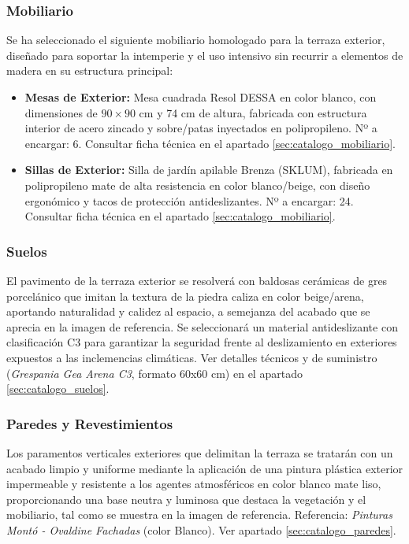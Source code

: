 \documentclass[12pt,a4paper]{article}
\begin{document}
\subsubsection{Mobiliario}
Se ha seleccionado el siguiente mobiliario homologado para la terraza exterior, diseñado para soportar la intemperie y el uso intensivo sin recurrir a elementos de madera en su estructura principal:
\begin{itemize}
    \item \textbf{Mesas de Exterior:} Mesa cuadrada Resol DESSA en color blanco, con dimensiones de $90 \times 90$ cm y 74 cm de altura, fabricada con estructura interior de acero zincado y sobre/patas inyectados en polipropileno. Nº a encargar: 6. Consultar ficha técnica en el apartado \ref{sec:catalogo_mobiliario}.
    \item \textbf{Sillas de Exterior:} Silla de jardín apilable Brenza (SKLUM), fabricada en polipropileno mate de alta resistencia en color blanco/beige, con diseño ergonómico y tacos de protección antideslizantes. Nº a encargar: 24. Consultar ficha técnica en el apartado \ref{sec:catalogo_mobiliario}.
\end{itemize}

\subsubsection{Suelos}
El pavimento de la terraza exterior se resolverá con baldosas cerámicas de gres porcelánico que imitan la textura de la piedra caliza en color beige/arena, aportando naturalidad y calidez al espacio, a semejanza del acabado que se aprecia en la imagen de referencia. Se seleccionará un material antideslizante con clasificación C3 para garantizar la seguridad frente al deslizamiento en exteriores expuestos a las inclemencias climáticas. Ver detalles técnicos y de suministro (\textit{Grespania Gea Arena C3}, formato 60x60 cm) en el apartado \ref{sec:catalogo_suelos}.

\subsubsection{Paredes y Revestimientos}
Los paramentos verticales exteriores que delimitan la terraza se tratarán con un acabado limpio y uniforme mediante la aplicación de una pintura plástica exterior impermeable y resistente a los agentes atmosféricos en color blanco mate liso, proporcionando una base neutra y luminosa que destaca la vegetación y el mobiliario, tal como se muestra en la imagen de referencia. Referencia: \textit{Pinturas Montó - Ovaldine Fachadas} (color Blanco). Ver apartado \ref{sec:catalogo_paredes}.
\end{document}
